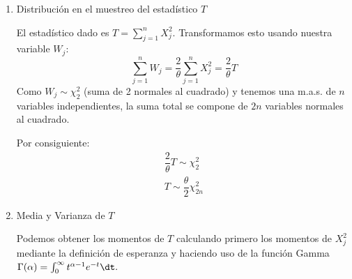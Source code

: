 \begin{enumerate}[label=\color{red}\textbf{\arabic*)}]
\begin{enumerate}[label=\arabic*)]
		            Aplicamos una segunda transformación $W_j=\dfrac{2}{\theta}Y_j$: \[
			            \begin{array}{c}
				            \varphi^{-1}(w)=\dfrac{\theta}{2}w\implies \dfrac{\mathrm{d}}{\mathrm{d}w}(\varphi^{-1}(w))=\dfrac{\theta}{2} \\
				            f_W(w)=\dfrac{1}{\theta}\exp\left( -\dfrac{\theta w / 2}{\theta} \right)\dfrac{\theta}{2}=\dfrac{1}{2}\exp\left( -\dfrac{w}{2} \right) ,\quad w>0
			            \end{array}
		            \]
		            La función de densidad de una distribución $\chi^2$ con $p$ grados de libertad es: \[
			            f(x)=\dfrac{1}{\Gamma(p / 2)2^{p / 2}}x^{p / 2-1}e^{-x / 2}
		            \]
		            Sustituyendo $p=2$ y sabiendo que $\Gamma(1)=1$ (donde $\Gamma(\alpha)=\int_{0}^{\infty} t^{\alpha-1}e^{-t}\dt$), obtenemos exactamente $\dfrac{1}{2}e^{-w / 2}$.

		            Por lo tanto: \[
			            W_j=\dfrac{2X_j^2}{\theta}\sim \chi_2^2
		            \]
		      \item Distribución en el muestreo del estadístico $T$

		            El estadístico dado es  $T=\sum_{j=1}^{n} X_j^2$. Transformamos esto usando nuestra variable $W_j$:  \[
			            \sum_{j=1}^{n} W_j=\dfrac{2}{\theta}\sum_{j=1}^{n} X_j^2=\dfrac{2}{\theta}T
		            \]
		            Como $W_j\sim \chi_2^2$ (suma de 2 normales al cuadrado) y tenemos una m.a.s. de $n$ variables independientes, la suma total se compone de $2n$ variables normales al cuadrado.

		            Por consiguiente:  \[
			            \begin{array}{c}
				            \dfrac{2}{\theta}T\sim \chi_2^2 \\
				            T\sim \dfrac{\theta}{2}\chi_{2n}^2
			            \end{array}
		            \]
		      \item Media y Varianza de $T$

		            Podemos obtener los momentos de $T$ calculando primero los momentos de  $X_j^2$ mediante la definición de esperanza y haciendo uso de la función Gamma $\Gamma(\alpha)=\int_{0}^{\infty}  t^{\alpha-1}e^{-t}\dt.$


\end{enumerate}
\end{enumerate}
